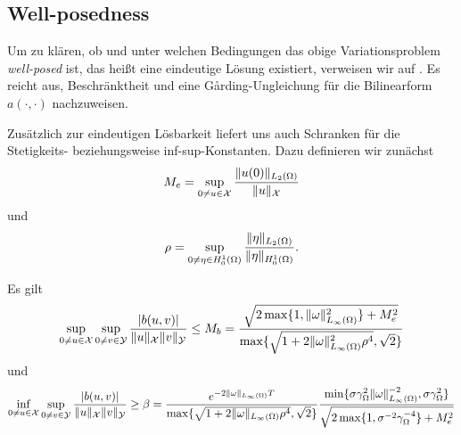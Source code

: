 \subsection{Well-posedness} %
\label{ssub:well_posedness}
Um zu klären, ob und unter welchen Bedingungen das obige Variationsproblem \emph{well-posed} ist, das heißt eine eindeutige Lösung existiert, verweisen wir auf \cite{Schwab:2009ec}.
Es reicht aus, Beschränktheit und eine G\aa{}rding-Ungleichung für die Bilinearform $a(\cdot, \cdot)$ nachzuweisen.

Zusätzlich zur eindeutigen Lösbarkeit liefert uns \cite{Schwab:2009ec} auch Schranken für die Stetigkeits- beziehungsweise inf-sup-Konstanten.
Dazu definieren wir zunächst
\begin{equation}
    M_{e} = \sup_{0 \neq u \in \mathcal X} \frac{\lVert u(0)\rVert_{L_{2}(\Omega)}}{\lVert u\rVert_{\mathcal X}}
\end{equation}
und
\begin{equation}
    \rho = \sup_{0 \neq \eta \in H^{1}_{0}(\Omega)} \frac{\lVert\eta\rVert_{L_{2}(\Omega)}}{\lVert\eta\rVert_{H^{1}_{0}(\Omega)}}.
\end{equation}

\begin{Lemma}
    \label{lemma:schranken_an_b}
    Es gilt
    \begin{equation}
        \sup_{0 \neq u \in \mathcal X} \sup_{0 \neq v \in \mathcal Y} \frac{\lvert b(u, v)\rvert}{\lVert u\rVert_{\mathcal X}\lVert v\rVert_{\mathcal Y}}
        \leq M_{b} = \frac{\sqrt{2 \max\{1, \lVert\omega\rVert_{L_{\infty}(\Omega)}^{2}\} + M_{e}^{2}}}{\max\{ \sqrt{1 + 2 \lVert\omega\rVert_{L_{\infty}(\Omega)}^{2} \rho^{4}}, \sqrt{2} \}}
    \end{equation}
    und
    \begin{equation}
        \inf_{0 \neq u \in \mathcal X} \sup_{0 \neq v \in \mathcal Y} \frac{\lvert b(u, v)\rvert}{\lVert u\rVert_{\mathcal X}\lVert v\rVert_{\mathcal Y}}
        \geq \beta = \frac{e^{-2 \lVert\omega\rVert_{L_{\infty}(\Omega)} T}}{\max\{\sqrt{ 1 + 2 \lVert\omega\rVert_{L_{\infty}(\Omega)} \rho^{4}}, \sqrt{2} \}} \frac{\min\{ \sigma \gamma_{\Omega}^{2} \lVert\omega\rVert_{L_{\infty}(\Omega)}^{-2}, \sigma \gamma_{\Omega}^{2} \}}{\sqrt{2 \max\{ 1, \sigma^{-2} \gamma_{\Omega}^{-4} \} + M_{e}^{2}}}
    \end{equation}
\end{Lemma}
